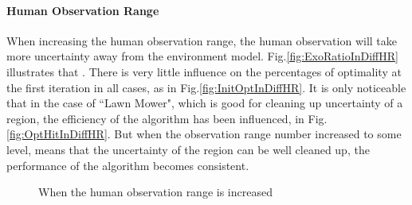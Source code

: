 \documentclass[12pt]{article}
\begin{document}
\paragraph{Human Observation Range}

When increasing the human observation range, the human observation will take more uncertainty away from the environment model. Fig.\ref{fig:ExoRatioInDiffHR} illustrates that . There is very little influence on the percentages of optimality at the first iteration in all cases, as in Fig.\ref{fig:InitOptInDiffHR}. It is only noticeable that in the case of ``Lawn Mower", which is good for cleaning up uncertainty of a region, the efficiency of the algorithm has been influenced, in Fig.\ref{fig:OptHitInDiffHR}. But when the observation range number increased to some level, means that the uncertainty of the region can be well cleaned up, the performance of the algorithm becomes consistent.

\begin{figure}[H] 
  \centering 
  \caption{When the human observation range is increased} 
  \label{fig:PMdiffHR} %
\end{figure}
\end{document}

